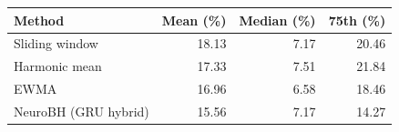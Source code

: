 \begin{tabular}{lrrr}
\toprule
Method & Mean (\%) & Median (\%) & 75th (\%)\\
\midrule
Sliding window & 18.13 & 7.17 & 20.46\\
Harmonic mean & 17.33 & 7.51 & 21.84\\
EWMA & 16.96 & 6.58 & 18.46\\
NeuroBH (GRU hybrid) & 15.56 & 7.17 & 14.27\\
\bottomrule
\end{tabular}
